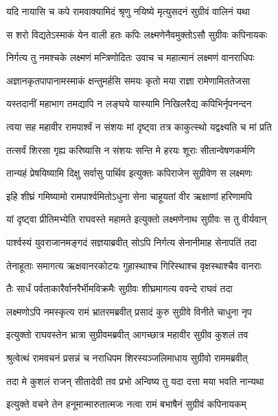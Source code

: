 \twolineshloka
{यदि नायासि च कपे रामवाक्यामिदं श्रृणु}
{नयिष्ये मृत्युसदनं सुग्रीवं वालिनं यथा} %

\twolineshloka
{स शरो विद्यतेऽस्माकं येन वाली हतः कपिः}
{लक्ष्मणेनैवमुक्तोऽसौ सुग्रीवः कपिनायकः} %

\twolineshloka
{निर्गत्य तु नमश्चके लक्ष्मणं मन्त्रिणोदितः}
{उवाच च महात्मानं लक्ष्मणं वानराधिपः} %

\twolineshloka
{अज्ञानकृतपापानामस्माकं क्षन्तुमर्हसि}
{समयः कृतो मया राज्ञा रामेणामिततेजसा} %

\twolineshloka
{यस्तदानीं महाभाग तमद्यापि न लङ्घये}
{यास्यामि निखिलरैद्य कपिभिर्नृपनन्दन} %

\twolineshloka
{त्वया सह महावीर रामपार्श्वं न संशयः}
{मां दृष्ट्वा तत्र काकुत्स्थो यद्वक्ष्यति च मां प्रति} %

\twolineshloka
{तत्सर्वं शिरसा गृह्य करिष्यासि न संशयः}
{सन्ति मे हरयः शूराः सीतान्वेषणकर्मणि} %

\twolineshloka
{तान्यहं प्रेषयिष्यामि दिक्षु सर्वासु पार्थिव}
{इत्युक्तः कपिराजेन सुग्रीवेण स लक्ष्मणः} %

\twolineshloka
{इहि शीघ्रं गमिष्यामो रामपार्श्वमितोऽधुना}
{सेना चाहूयतां वीर ऋक्षाणां हरिणामपि} %

\twolineshloka
{यां दृष्ट्वा प्रीतिमभ्येति राघवस्ते महामते}
{इत्युक्तो लक्ष्मणेनाथ सुग्रीवः स तु वीर्यवान्} %

\twolineshloka
{पार्श्वस्यं युवराजानमङ्गदं सज्ञयाब्रवीत्}
{सोऽपि निर्गत्य सेनानीमाह सेनापतिं तदा} %

\twolineshloka
{तेनाहूताः समागत्य ऋक्षवानरकोटयः}
{गुहास्थाश्च गिरिस्थाश्च वृक्षस्थाश्चैव वानराः} %

\twolineshloka
{तैः सार्धं पर्वताकारैर्वानरैर्भीमविक्रमैः}
{सुग्रीवः शीघ्रमागत्य ववन्दे राघवं तदा} %

\twolineshloka
{लक्ष्मणोऽपि नमस्कृत्य रामं भ्रातरमब्रवीत्}
{प्रसादं कुरु सुग्रीवे विनीते चाधुना नृप} %

\twolineshloka
{इत्युक्तो राघवस्तेन भ्रात्रा सुग्रीवमब्रवीत्}
{आगच्छात्र महावीर सुग्रीव कुशलं तव} %

\twolineshloka
{श्रुत्वेत्थं रामवचनं प्रसन्नं च नराधिपम}
{शिरस्यञ्जलिमाधाय सुग्रीवो राममब्रवीत्} %

\twolineshloka
{तदा मे कुशलं राजन् सीतादेवी तव प्रभो}
{अन्विष्य तु यदा दत्ता मया भवति नान्यथा} %

\twolineshloka
{इत्युक्ते वचने तेन हनूमान्मारुतात्मजः}
{नत्वा रामं बभाषैनं सुग्रीवं कपिनायकम्} %

